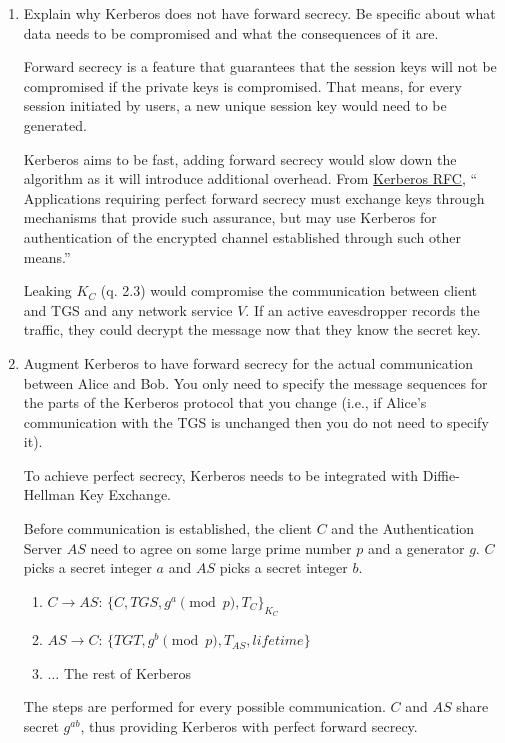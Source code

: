 \documentclass[11pt]{article}
\begin{document}
\begin{enumerate}
    \item  Explain why Kerberos does not have forward secrecy. Be specific about what data needs to be compromised and what the consequences of it are.

    Forward secrecy is a feature that guarantees that the session keys will not be compromised if the private keys is compromised. That means, for every session initiated by users, a new unique session key would need to be generated.

    Kerberos aims to be fast, adding forward secrecy would slow down the algorithm as it will introduce additional overhead. From \href{https://tools.ietf.org/html/rfc4120}{Kerberos RFC}, `` Applications requiring perfect forward secrecy must exchange keys through mechanisms that provide such assurance, but may use Kerberos for authentication of the encrypted channel established through such other means.''

    Leaking $K_{C}$ (q. 2.3) would compromise the communication between client and TGS and any network service $V$. If an active eavesdropper records the traffic, they could decrypt the message now that they know the secret key.

    \item Augment Kerberos to have forward secrecy for the actual communication between Alice and Bob. You only need to specify the message sequences for the parts of the Kerberos protocol that you change (i.e., if Alice’s communication with the TGS is unchanged then you do not need to specify it).

    To achieve perfect secrecy, Kerberos needs to be integrated with Diffie-Hellman Key Exchange.
    
    Before communication is established, the client $C$ and the Authentication Server $AS$ need to agree on some large prime number $p$ and a generator $g$. $C$ picks a secret integer $a$ and $AS$ picks a secret integer $b$.  

    \begin{enumerate}
      \item $C \to AS$: $\{ C, TGS, g^{a} \pmod{p}, T_{C} \}_{K_{C} }$
      \item $AS \to C$: $\{ TGT, g^{b} \pmod{p}, T_{AS}, lifetime \}$
      \item $\dots$ The rest of Kerberos
    \end{enumerate}

    The steps are performed for every possible communication. $C$ and $AS$ share secret $g^{ab}$, thus providing Kerberos with perfect forward secrecy.

\end{enumerate}
\end{document}
